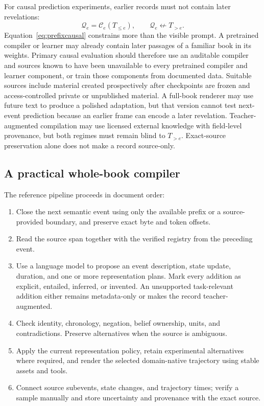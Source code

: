 \documentclass[11pt]{article}
\newcommand{\record}{\mathcal{Q}}
\newcommand{\compiler}{\mathcal{C}}
\begin{document}
For causal prediction experiments, earlier records must not contain later revelations:
\begin{equation}
  \record_e=\compiler_e(T_{\le e}), \qquad
  \record_e\not\leftarrow T_{>e}.
  \label{eq:prefixcausal}
\end{equation}
Equation~\ref{eq:prefixcausal} constrains more than the visible prompt. A pretrained compiler or learner may already contain later passages of a familiar book in its weights. Primary causal evaluation should therefore use an auditable compiler and sources known to have been unavailable to every pretrained compiler and learner component, or train those components from documented data. Suitable sources include material created prospectively after checkpoints are frozen and access-controlled private or unpublished material. A full-book renderer may use future text to produce a polished adaptation, but that version cannot test next-event prediction because an earlier frame can encode a later revelation. Teacher-augmented compilation may use licensed external knowledge with field-level provenance, but both regimes must remain blind to $T_{>e}$. Exact-source preservation alone does not make a record source-only.

\subsection{A practical whole-book compiler}

The reference pipeline proceeds in document order:

\begin{enumerate}[leftmargin=1.6em,itemsep=2pt,topsep=3pt]
  \item Close the next semantic event using only the available prefix or a source-provided boundary, and preserve exact byte and token offsets.
  \item Read the source span together with the verified registry from the preceding event.
  \item Use a language model to propose an event description, state update, duration, and one or more representation plans. Mark every addition as explicit, entailed, inferred, or invented. An unsupported task-relevant addition either remains metadata-only or makes the record teacher-augmented.
  \item Check identity, chronology, negation, belief ownership, units, and contradictions. Preserve alternatives when the source is ambiguous.
  \item Apply the current representation policy, retain experimental alternatives where required, and render the selected domain-native trajectory using stable assets and tools.
  \item Connect source subevents, state changes, and trajectory times; verify a sample manually and store uncertainty and provenance with the exact source.
\end{enumerate}
\end{document}

